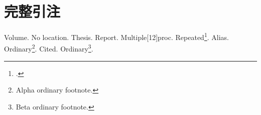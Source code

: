 \documentclass{cuebthesis}
\begin{document}
\cuebfrontmatter
\noindent{}
\section{完整引注}
Volume. No location.
Thesis. Report.
Multiple[12]{proc}.
Repeated\footcites[13]{volume}[14]{proc}.
Alias\cites[15]{volume}[16]{proc}.
\clearpage
\setcounter{footnote}{98}
Ordinary\footnote{Alpha ordinary footnote.}. Cited\cite{volume}.
Ordinary\footnote{Beta ordinary footnote.}.
\nocite{*}
\cuebprintbibliography
\end{document}
